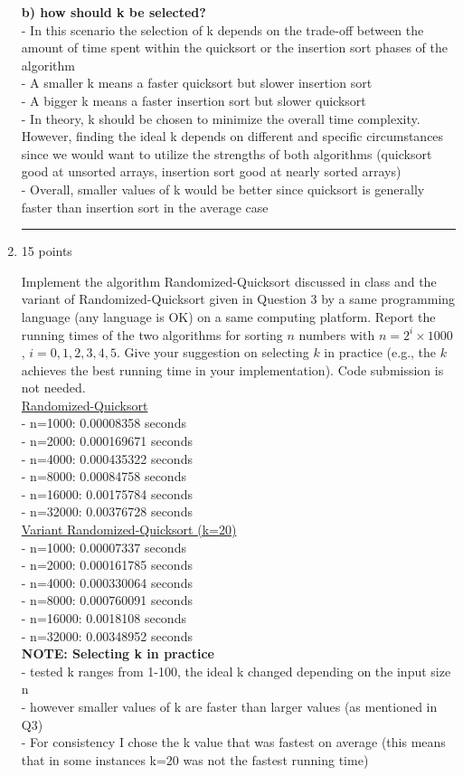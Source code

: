\documentclass[letterpaper,12pt]{article}
\begin{document}
\begin{enumerate}
\textbf{b) how should k be selected?} \\
- In this scenario the selection of k depends on the trade-off between the amount of time spent within the quicksort or the insertion sort phases of the algorithm \\
- A smaller k means a faster quicksort but slower insertion sort \\
- A bigger k means a faster insertion sort but slower quicksort \\
- In theory, k should be chosen to minimize the overall time complexity. However, finding the ideal k depends on different and specific circumstances since we would want to utilize the strengths of both algorithms (quicksort good at unsorted arrays, insertion sort good at nearly sorted arrays) \\
- Overall, smaller values of k would be better since quicksort is generally faster than insertion sort in the average case

\noindent\rule{16cm}{0.1pt}

\item 15 points

Implement the algorithm Randomized-Quicksort discussed in class and the variant
of Randomized-Quicksort given in Question 3 by a same programming language (any
language is OK) on a same computing platform. Report the running times of the two
algorithms for sorting $n$ numbers with $n=2^i\times 1000$, $i=0,1,2,3,4,5$. Give 
your suggestion on selecting $k$ in practice (e.g., the $k$ achieves the best 
running time in your implementation). Code submission is not needed. \\
\underline{Randomized-Quicksort} \\
- n=1000: 0.00008358 seconds \\
- n=2000: 0.000169671 seconds \\
- n=4000: 0.000435322 seconds \\
- n=8000: 0.00084758 seconds \\
- n=16000: 0.00175784 seconds \\
- n=32000: 0.00376728 seconds \\
\underline{Variant Randomized-Quicksort (k=20)} \\
- n=1000: 0.00007337 seconds \\
- n=2000: 0.000161785 seconds \\
- n=4000: 0.000330064 seconds \\
- n=8000: 0.000760091 seconds \\
- n=16000: 0.0018108 seconds \\
- n=32000: 0.00348952 seconds \\
\textbf{NOTE: Selecting k in practice} \\
- tested k ranges from 1-100, the ideal k changed depending on the input size n \\
- however smaller values of k are faster than larger values (as mentioned in Q3) \\
- For consistency I chose the k value that was fastest on average (this means that in some instances k=20 was not the fastest running time)


\end{enumerate}
\end{document}
